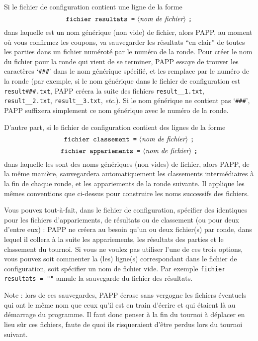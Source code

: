 \documentclass[10pt]{article}
\begin{document}
 Si le fichier de configuration contient une ligne de la
forme 
$$\hbox{\verb|fichier resultats =| \gram{nom de fichier} \verb|;|}$$
dans laquelle  est un nom g\'en\'erique (non 
vide) de fichier, alors PAPP, au moment o\`u vous confirmez les 
coupons, va sauvegarder les r\'esultats ``en clair'' de toutes les 
parties dans un fichier num\'erot\'e par le num\'ero de la ronde.  
Pour cr\'eer le nom du fichier pour la ronde qui vient de se terminer, 
PAPP essaye de trouver les caract\`eres `\verb|###|' dans le nom 
g\'en\'erique sp\'ecifi\'e, et les remplace par le num\'ero de la 
ronde (par exemple, si le nom g\'en\'erique dans le fichier de 
configuration est \verb|result###.txt|, PAPP cr\'eera la suite des 
fichiers \verb|result__1.txt|, \verb|result__2.txt|, 
\verb|result__3.txt|, \emph{etc.}).  Si le nom g\'en\'erique ne 
contient pas `\verb|###|', PAPP suffixera simplement ce nom 
g\'en\'erique avec le num\'ero de la ronde.

D'autre part, si le fichier de configuration contient des lignes de la
forme 
$$\hbox{\verb|fichier classement =| \gram{nom de fichier} \verb|;|}$$
$$\hbox{\verb|fichier appariements =| \gram{nom de fichier} \verb|;|}$$
dans laquelle les  sont des noms g\'en\'eriques (non 
vides) de fichier, alors PAPP, de la m\^eme mani\`ere, sauvegardera 
automatiquement les classements interm\'ediaires \`a la fin de chaque 
ronde, et les appariements de la ronde suivante.  Il applique les 
m\^emes conventions que ci-dessus pour construire les noms successifs 
des fichiers.

Vous pouvez tout-\`a-fait, dans le fichier de configuration, 
sp\'ecifier des  identiques pour les fichiers 
d'appariements, de r\'esultats ou de classement (ou pour deux d'entre 
eux) : PAPP ne cr\'eera au besoin qu'un ou deux fichier(s) par ronde, 
dans lequel il collera \`a la suite les appariements, les r\'esultats 
des parties et le classement du tournoi.  Si vous ne voulez pas 
utiliser l'une de ces trois options, vous pouvez soit commenter la 
(les) ligne(s) correspondant dans le fichier de configuration, soit 
sp\'ecifier un nom de fichier vide.  Par exemple 
\hbox{\verb|fichier resultats = ""|} annule la sauvegarde du fichier 
des r\'esultats.


Note : lors de ces sauvegardes, PAPP \'ecrase sans vergogne les 
fichiers \'eventuels qui ont le m\^eme nom que ceux qu'il est en train 
d'\'ecrire et qui \'etaient l\`a au d\'emarrage du programme.  Il faut 
donc penser \`a la fin du tournoi \`a d\'eplacer en lieu s\^ur ces 
fichiers, faute de quoi ils risqueraient d'\^etre perdus lors du 
tournoi suivant.
\end{document}
